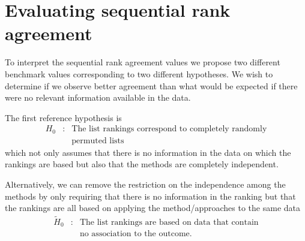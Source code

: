 \documentclass[12pt,a4paper]{article}
\newcommand{\nn}{\nonumber}
\theoremstyle{plain}
\begin{document}





\section{Evaluating sequential rank agreement}
To interpret the sequential rank agreement values we propose two
different benchmark values corresponding to two different
hypotheses. We wish to determine if we observe better agreement than
what would be expected if there were no relevant information available
in the data.

The first reference hypothesis is
\begin{eqnarray}
H_0  & : &  \text{The list rankings correspond to completely randomly}\label{eq:permutationHypothesis}\\
       &  & \text{permuted lists}\nn
\end{eqnarray}
which not only assumes that there is no information in the data on
which the rankings are based but also that the methods are completely
independent.

Alternatively, we can remove the restriction on the independence among
the methods by only requiring that there is no information in the
ranking but that the rankings are all based on applying the
method/approaches to the same data
\begin{eqnarray*}
\widetilde H_0 & :&  \text{The list rankings are based on data that contain}\\
& &   \text{no association to the outcome.}
\end{eqnarray*}
\end{document}

